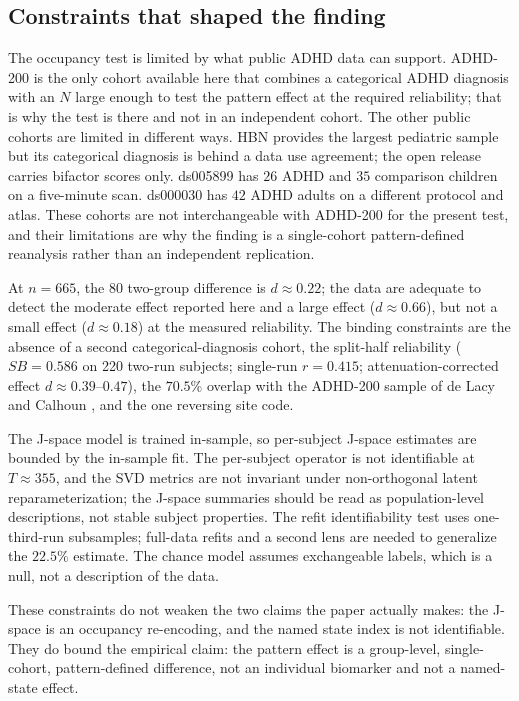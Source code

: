 \documentclass[11pt]{article}
\theoremstyle{definition}
\begin{document}
\subsection*{Constraints that shaped the finding}

The occupancy test is limited by what public ADHD data can support. ADHD-200 is the only
cohort available here that combines a categorical ADHD diagnosis with an $N$ large enough to
test the pattern effect at the required reliability; that is why the test is there and
not in an independent cohort. The other public cohorts are limited in different ways.
HBN provides the largest pediatric sample but its categorical diagnosis is behind a data
use agreement; the open release carries bifactor scores only. ds005899 has $26$ ADHD and
$35$ comparison children on a five-minute scan. ds000030 has $42$ ADHD adults on a
different protocol and atlas. These cohorts are
not interchangeable with ADHD-200 for the present test, and
their limitations are why the finding is a single-cohort pattern-defined reanalysis
rather than an independent replication.

At $n=665$, the 80%
two-group difference is $d\approx0.22$; the data are adequate to detect the moderate
effect reported here and a large effect ($d\approx0.66$), but not a small effect
($d\approx0.18$) at the measured reliability. The binding constraints are the absence of
a second categorical-diagnosis cohort, the split-half reliability ($SB=0.586$ on 220
two-run subjects; single-run $r=0.415$; attenuation-corrected effect $d\approx0.39$--$0.47$),
the $70.5\%$ overlap with the ADHD-200 sample of de Lacy and Calhoun \cite{deLacy2019},
and the one reversing site code.

The J-space model is trained in-sample, so per-subject
J-space estimates are bounded by the in-sample fit.
The per-subject operator is not identifiable at $T\approx355$, and the SVD metrics are
not invariant under non-orthogonal latent reparameterization; the J-space summaries
should be read as population-level descriptions, not stable subject properties. The refit identifiability test uses one-third-run
subsamples; full-data refits and a second lens are needed to generalize the $22.5\%$
estimate. The chance model assumes exchangeable labels, which is a null, not a
description of the data.

These constraints do not weaken the two claims the paper actually makes: the J-space is
an occupancy re-encoding, and the named state index is not identifiable. They do bound
the empirical claim: the pattern effect is a group-level, single-cohort, pattern-defined
difference, not an individual biomarker and not a named-state effect.
\end{document}
